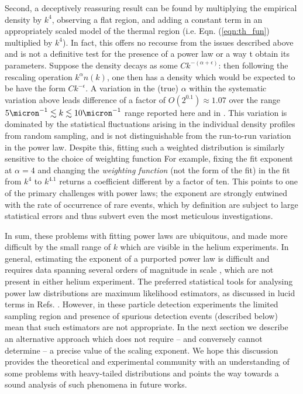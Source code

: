 	Second, a deceptively reassuring result can be found by multiplying the empirical density by $k^4$, observing a flat region, and adding a constant term in an appropriately scaled model of the thermal region (i.e. Eqn. (\ref{eqn:th_fun}) multiplied by $k^4$). 
	In fact, this offers no recourse from the issues described above and is not a definitive test for the presence of a power law or a way t obtain its parameters.
	Suppose the density decays as some $C k^{-(\alpha+\epsilon)}$: then following the rescaling operation $k^\alpha n(k)$, one then has a density which would be expected to be have the form $C k^{-\epsilon}$. 
	A variation in the (true) $\alpha$ within the systematic variation above leads difference of a factor of $O(2^{0.1})\approx1.07$ over the range $5\micron^{-1}\lesssim k\lesssim10\micron^{-1}$ range reported here and in \cite{Chang16}.
	This variation is dominated by the statistical fluctuations arising in the individual density profiles from random sampling, and is not distinguishable from the run-to-run variation in the power law. 
	Despite this, fitting such a weighted distribution is similarly sensitive to the choice of weighting function
	For example, fixing the fit exponent at $\alpha=4$ and changing the \emph{weighting function} (not the form of the fit) in the fit from $k^4$ to $k^{4.1}$ returns a coefficient different by a factor of ten.
	This points to one of the primary challenges with power laws; the exponent are strongly entwined with the rate of occurrence of rare events, which by definition are subject to large statistical errors and thus subvert even the most meticulous investigations.

	In sum, these problems with fitting power laws are ubiquitous, and made more difficult by the small range of $k$ which are visible in the helium experiments.
	In general, estimating the exponent of a purported power law is difficult and requires data spanning several orders of magnitude in scale \cite{Goldstein04,Clauset09,Virkar14,Hanel17}, which are not present in either helium experiment.
	The preferred statistical tools for analysing power law distributions are maximum likelihood estimators, as discussed in lucid terms in Refs. \cite{Clauset09,Virkar14}.
	However, in these particle detection experiments the limited sampling region and presence of spurious detection events (described below) mean that such estimators are not appropriate.
	In the next section we describe an alternative approach which does not require -- and conversely cannot determine -- a precise value of the scaling exponent.
	We hope this discussion provides the theoretical and experimental community with an understanding of some problems with heavy-tailed distributions and points the way towards a sound analysis of such phenomena in future works.
	
